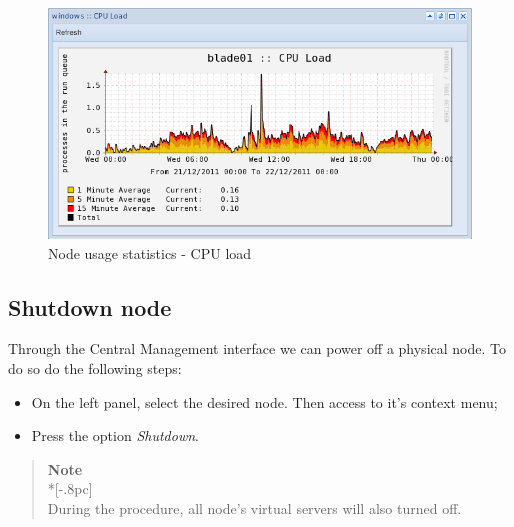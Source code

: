 \begin{figure}[H]
	\begin{center}
	\includegraphics[scale=0.6]{screenshots/server_stats_nodeLoadRange.png}
	\caption{Node usage statistics - CPU load}
	\label{fig:server_stats_nodeLoadRange}
	\end{center}
\end{figure}

\subsection{Shutdown node}
\label{sub:shutdown_node}
Through the Central Management interface we can power off a physical node. To do so do the following steps:

\begin{itemize}
\item On the left panel, select the desired node. Then access to it's context menu;
\item Press the option \textit{Shutdown}.
\end{itemize}

\begin{quote}
    {\large \bf Note} \\*[-.8pc]
    \underline{\hspace{6in}} \\
    During the procedure, all node's virtual servers will also turned off.
\end{quote}


